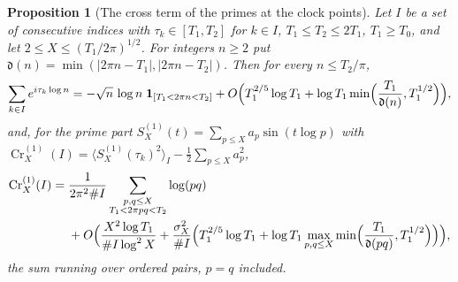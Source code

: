 \documentclass[preprint,12pt]{elsarticle}
\numberwithin{equation}{section}
\theoremstyle{plain}
\newtheorem{proposition}[theorem]{Proposition}
\theoremstyle{definition}
\theoremstyle{remark}
\newcommand{\Cr}{\operatorname{Cr}}
\begin{document}
\begin{proposition}[The cross term of the primes at the clock points]\label{prop:pair_resonance}
Let $I$ be a set of consecutive indices with $\tau_k\in[T_1,T_2]$ for $k\in I$, $T_1\le T_2\le2T_1$, $T_1\ge T_0$, and let $2\le X\le(T_1/2\pi)^{1/2}$. For integers $n\ge2$ put $\mathfrak d(n)=\min(|2\pi n-T_1|,|2\pi n-T_2|)$. Then for every $n\le T_2/\pi$,
\begin{equation}
\sum_{k\in I}e^{i\tau_k\log n}=-\sqrt n\,\log n\;\mathbf 1_{[T_1<2\pi n<T_2]}+O\Bigl(T_1^{2/5}\log T_1+\log T_1\min\Bigl(\frac{T_1}{\mathfrak d(n)},T_1^{1/2}\Bigr)\Bigr),
\label{eq:pair_resonance}
\end{equation}
and, for the prime part $S^{(1)}_X(t)=\sum_{p\le X}a_p\sin(t\log p)$ with $\Cr^{(1)}_X(I)=\langle S^{(1)}_X(\tau_k)^2\rangle_I-\frac12\sum_{p\le X}a_p^2$,
\begin{equation}
\begin{split}
\Cr^{(1)}_X(I)={}&\frac1{2\pi^2\#I}\sum_{\substack{p,q\le X\\T_1<2\pi pq<T_2}}\log(pq)\\
&+O\Bigl(\frac{X^2\log T_1}{\#I\log^2X}+\frac{\sigma_X^2}{\#I}\Bigl(T_1^{2/5}\log T_1+\log T_1\max_{p,q\le X}\min\Bigl(\frac{T_1}{\mathfrak d(pq)},T_1^{1/2}\Bigr)\Bigr)\Bigr),
\end{split}
\label{eq:cross_term_pairs}
\end{equation}
the sum running over ordered pairs, $p=q$ included.
\end{proposition}
\end{document}
